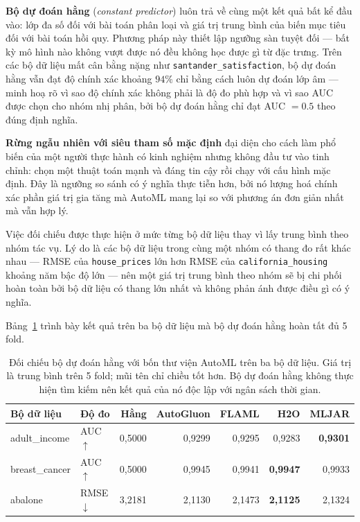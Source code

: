 \textbf{Bộ dự đoán hằng} (\textit{constant predictor}) luôn trả về cùng một kết
quả bất kể đầu vào: lớp đa số đối với bài toán phân loại và giá trị trung bình của
biến mục tiêu đối với bài toán hồi quy. Phương pháp này thiết lập ngưỡng sàn tuyệt
đối --- bất kỳ mô hình nào không vượt được nó đều không học được gì từ đặc trưng.
Trên các bộ dữ liệu mất cân bằng nặng như \texttt{santander\_satisfaction}, bộ dự
đoán hằng vẫn đạt độ chính xác khoảng $94\%$ chỉ bằng cách luôn dự đoán lớp âm ---
minh hoạ rõ vì sao độ chính xác không phải là độ đo phù hợp và vì sao AUC được
chọn cho nhóm nhị phân, bởi bộ dự đoán hằng chỉ đạt AUC $= 0.5$ theo đúng định
nghĩa.

\textbf{Rừng ngẫu nhiên với siêu tham số mặc định} đại diện cho cách làm phổ biến
của một người thực hành có kinh nghiệm nhưng không đầu tư vào tinh chỉnh: chọn một
thuật toán mạnh và đáng tin cậy rồi chạy với cấu hình mặc định. Đây là ngưỡng so
sánh có ý nghĩa thực tiễn hơn, bởi nó lượng hoá chính xác phần giá trị gia tăng mà
AutoML mang lại so với phương án đơn giản nhất mà vẫn hợp lý.

Việc đối chiếu được thực hiện ở mức từng bộ dữ liệu thay vì lấy trung bình theo
nhóm tác vụ. Lý do là các bộ dữ liệu trong cùng một nhóm có thang đo rất khác
nhau --- RMSE của \texttt{house\_prices} lớn hơn RMSE của
\texttt{california\_housing} khoảng năm bậc độ lớn --- nên một giá trị trung bình
theo nhóm sẽ bị chi phối hoàn toàn bởi bộ dữ liệu có thang lớn nhất và không phản
ánh được điều gì có ý nghĩa.

Bảng~\ref{tab:baseline} trình bày kết quả trên ba bộ dữ liệu mà bộ dự đoán hằng
hoàn tất đủ 5 fold.

\begin{table}[H]
  \centering
  \small
  \caption{Đối chiếu bộ dự đoán hằng với bốn thư viện AutoML trên ba bộ dữ liệu.
  Giá trị là trung bình trên 5 fold; mũi tên chỉ chiều tốt hơn. Bộ dự đoán hằng
  không thực hiện tìm kiếm nên kết quả của nó độc lập với ngân sách thời gian.}
  \label{tab:baseline}
  \renewcommand{\arraystretch}{1.25}
  \begin{tabularx}{\linewidth}{@{}X l r r r r r@{}}
    \toprule
    \textbf{Bộ dữ liệu} & \textbf{Độ đo} & \textbf{Hằng} & \textbf{AutoGluon} & \textbf{FLAML} & \textbf{H2O} & \textbf{MLJAR} \\
    \midrule
    adult\_income  & AUC $\uparrow$  & 0,5000 & 0,9299 & 0,9295 & 0,9283 & \textbf{0,9301} \\
    breast\_cancer & AUC $\uparrow$  & 0,5000 & 0,9945 & 0,9941 & \textbf{0,9947} & 0,9933 \\
    abalone        & RMSE $\downarrow$ & 3,2181 & 2,1130 & 2,1473 & \textbf{2,1125} & 2,1324 \\
    \bottomrule
  \end{tabularx}
\end{table}

